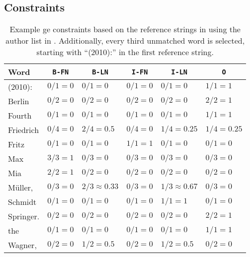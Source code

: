 \clearpage
\subsection{ Constraints}\label{app:subsec-ge-constraints}
\begin{table}[h]
\centering
\begin{tabular}{l l l l l l}
  \toprule
  Word &\multicolumn{1}{c}{\texttt{B-FN}}&\multicolumn{1}{c}{\texttt{B-LN}}&\multicolumn{1}{c}{\texttt{I-FN}}&\multicolumn{1}{c}{\texttt{I-LN}}&\multicolumn{1}{c}{\texttt{O}}\\
  \midrule    %
  (2010):     & $0/1=0$   & $0/1=0$          & $0/1=0$    & $0/1=0$          & $1/1=1$   \\
  Berlin      & $0/2=0$   & $0/2=0$          & $0/2=0$    & $0/2=0$          & $2/2=1$   \\
  Fourth      & $0/1=0$   & $0/1=0$          & $0/1=0$    & $0/1=0$          & $1/1=1$   \\
  Friedrich   & $0/4=0$   & $2/4=0.5$        & $0/4=0$    & $1/4=0.25$       & $1/4=0.25$\\
  Fritz       & $0/1=0$   & $0/1=0$          & $1/1=1$  & $0/1=0$          & $0/1=0$   \\
  Max         & $3/3=1$   & $0/3=0$          & $0/3=0$    & $0/3=0$          & $0/3=0$   \\
  Mia         & $2/2=1$   & $0/2=0$          & $0/2=0$    & $0/2=0$          & $0/2=0$   \\
  M\"{u}ller, & $0/3=0$   & $2/3\approx0.33$ & $0/3=0$    & $1/3\approx0.67$ & $0/3=0$   \\
  Schmidt     & $0/1=0$   & $0/1=0$          & $0/1=0$    & $1/1=1$          & $0/1=0$   \\
  Springer.   & $0/2=0$   & $0/2=0$          & $0/2=0$    & $0/2=0$          & $2/2=1$   \\
  the         & $0/1=0$   & $0/1=0$          & $0/1=0$    & $0/1=0$          & $1/1=1$   \\
  Wagner,     & $0/2=0$   & $1/2=0.5$        & $0/2=0$    & $1/2=0.5$        & $0/2=0$   \\
  \bottomrule
\end{tabular}
\caption{Example \gls{ge} constraints based on the reference strings in  using the author list in . Additionally, every third unmatched word is selected, starting with ``(2010):'' in the first reference string.}
\label{tab:example-ge-constraints}
\end{table}


